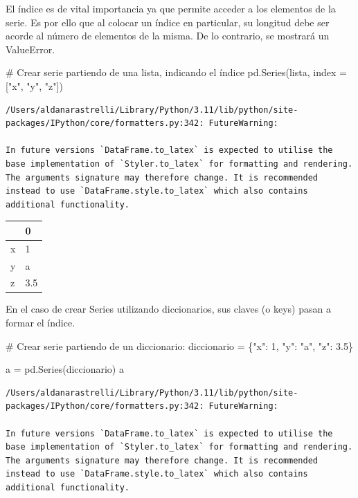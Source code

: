 \documentclass[
  letterpaper,
  DIV=11,
  numbers=noendperiod]{scrreprt}
\newenvironment{Shaded}{\begin{snugshade}}{\end{snugshade}}
\newcommand{\CommentTok}[1]{\textcolor[rgb]{0.37,0.37,0.37}{#1}}
\newcommand{\DecValTok}[1]{\textcolor[rgb]{0.68,0.00,0.00}{#1}}
\newcommand{\FloatTok}[1]{\textcolor[rgb]{0.68,0.00,0.00}{#1}}
\newcommand{\NormalTok}[1]{\textcolor[rgb]{0.00,0.23,0.31}{#1}}
\newcommand{\OperatorTok}[1]{\textcolor[rgb]{0.37,0.37,0.37}{#1}}
\newcommand{\StringTok}[1]{\textcolor[rgb]{0.13,0.47,0.30}{#1}}
\begin{document}
El índice es de vital importancia ya que permite acceder a los elementos
de la serie. Es por ello que al colocar un índice en particular, su
longitud debe ser acorde al número de elementos de la misma. De lo
contrario, se mostrará un ValueError.

\begin{Shaded}
\begin{Highlighting}[]
\CommentTok{\# Crear serie partiendo de una lista, indicando el índice}
\NormalTok{pd.Series(lista, index }\OperatorTok{=}\NormalTok{ [}\StringTok{"x"}\NormalTok{, }\StringTok{"y"}\NormalTok{, }\StringTok{"z"}\NormalTok{])}
\end{Highlighting}
\end{Shaded}

\begin{verbatim}
/Users/aldanarastrelli/Library/Python/3.11/lib/python/site-packages/IPython/core/formatters.py:342: FutureWarning:

In future versions `DataFrame.to_latex` is expected to utilise the base implementation of `Styler.to_latex` for formatting and rendering. The arguments signature may therefore change. It is recommended instead to use `DataFrame.style.to_latex` which also contains additional functionality.
\end{verbatim}

\begin{tabular}{ll}
\toprule
{} &    0 \\
\midrule
x &    1 \\
y &    a \\
z &  3.5 \\
\bottomrule
\end{tabular}

En el caso de crear Series utilizando diccionarios, sus claves (o keys)
pasan a formar el índice.

\begin{Shaded}
\begin{Highlighting}[]
\CommentTok{\# Crear serie partiendo de un diccionario:}
\NormalTok{diccionario }\OperatorTok{=}\NormalTok{ \{}\StringTok{"x"}\NormalTok{: }\DecValTok{1}\NormalTok{, }\StringTok{"y"}\NormalTok{: }\StringTok{"a"}\NormalTok{, }\StringTok{"z"}\NormalTok{: }\FloatTok{3.5}\NormalTok{\}}

\NormalTok{a }\OperatorTok{=}\NormalTok{ pd.Series(diccionario)}
\NormalTok{a}
\end{Highlighting}
\end{Shaded}

\begin{verbatim}
/Users/aldanarastrelli/Library/Python/3.11/lib/python/site-packages/IPython/core/formatters.py:342: FutureWarning:

In future versions `DataFrame.to_latex` is expected to utilise the base implementation of `Styler.to_latex` for formatting and rendering. The arguments signature may therefore change. It is recommended instead to use `DataFrame.style.to_latex` which also contains additional functionality.
\end{verbatim}
\end{document}

